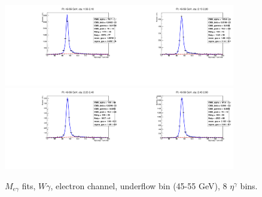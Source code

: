 \begin{figure}[htb]
\begin{center}
   \includegraphics[width=0.45\textwidth]{../figs/figs_v11/ELECTRON_WGamma/EtoGammaFits/sa_hZmass_h_Data_EtoGamma_Enr_ENDCAP_pt45to55_ieta0_noWMtCut.pdf}\includegraphics[width=0.45\textwidth]{../figs/figs_v11/ELECTRON_WGamma/EtoGammaFits/sa_hZmass_h_Data_EtoGamma_Enr_ENDCAP_pt45to55_ieta1_noWMtCut.pdf}\\
   \includegraphics[width=0.45\textwidth]{../figs/figs_v11/ELECTRON_WGamma/EtoGammaFits/sa_hZmass_h_Data_EtoGamma_Enr_ENDCAP_pt45to55_ieta2_noWMtCut.pdf}\includegraphics[width=0.45\textwidth]{../figs/figs_v11/ELECTRON_WGamma/EtoGammaFits/sa_hZmass_h_Data_EtoGamma_Enr_ENDCAP_pt45to55_ieta3_noWMtCut.pdf}\\
  \label{fig:etogFits_45to55}
  \caption{$M_{e\gamma}$ fits, $W\gamma$, electron channel, underflow bin (45-55 GeV), 8 $\eta^{\gamma}$ bins.}
  \end{center}
\end{figure}

